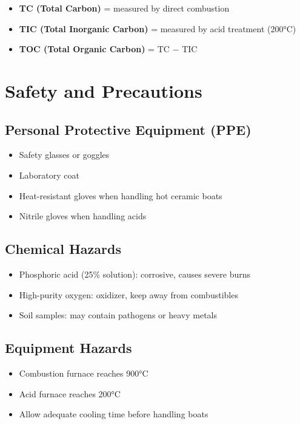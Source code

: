 \documentclass[11pt,a4paper]{article}\usepackage[]{graphicx}\usepackage[]{xcolor}
\begin{document}
\begin{itemize}[noitemsep]
    \item \textbf{TC (Total Carbon)} = measured by direct combustion
    \item \textbf{TIC (Total Inorganic Carbon)} = measured by acid treatment (200°C)
    \item \textbf{TOC (Total Organic Carbon)} = TC $-$ TIC
\end{itemize}

\section{Safety and Precautions}

\subsection{Personal Protective Equipment (PPE)}
\begin{itemize}[noitemsep]
    \item Safety glasses or goggles
    \item Laboratory coat
    \item Heat-resistant gloves when handling hot ceramic boats
    \item Nitrile gloves when handling acids
\end{itemize}

\subsection{Chemical Hazards}
\begin{itemize}[noitemsep]
    \item Phosphoric acid (25\% solution): corrosive, causes severe burns
    \item High-purity oxygen: oxidizer, keep away from combustibles
    \item Soil samples: may contain pathogens or heavy metals
\end{itemize}

\subsection{Equipment Hazards}
\begin{itemize}[noitemsep]
    \item Combustion furnace reaches 900°C
    \item Acid furnace reaches 200°C
    \item Allow adequate cooling time before handling boats
\end{itemize}
\end{document}
